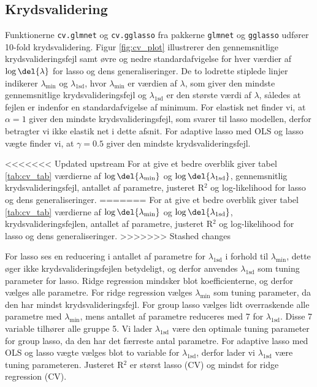 \subsection{Krydsvalidering}
Funktionerne \texttt{cv.glmnet} og \texttt{cv.gglasso} fra pakkerne \texttt{glmnet} og \texttt{gglasso} udfører 10-fold krydsvalidering.
Figur \ref{fig:cv_plot} illustrerer den gennemsnitlige krydsvalideringsfejl samt øvre og nedre standardafvigelse for hver værdier af $\log \del{\lambda}$ for lasso og dens generaliseringer. 
De to lodrette stiplede linjer indikerer \(\lambda_{\text{min}}\) og \(\lambda_\text{1sd}\), hvor \(\lambda_{\text{min}}\) er værdien af \(\lambda\), som giver den mindste gennemsnitlige krydsvalideringsfejl og \(\lambda_\text{1sd}\) er den største værdi af \(\lambda\), således at fejlen er indenfor en standardafvigelse af minimum. 
For elastisk net finder vi, at $\alpha =1$ giver den mindste krydsvalideringsfejl, som svarer til lasso modellen, derfor betragter vi ikke elastik net i dette afsnit. 
For adaptive lasso med OLS og lasso vægte finder vi, at $\gamma = 0.5$ giver den mindste krydsvalideringsfejl. 

%
<<<<<<< Updated upstream
For at give et bedre overblik giver tabel \ref{tab:cv_tab} værdierne af $\log \del{ \lambda_{\min}}$ og $\log \del{ \lambda_{1\text{sd}}}$, gennemsnitlig krydsvalideringsfejl, antallet af parametre, justeret R$^2$ og log-likelihood for lasso og dens generaliseringer.
=======
For at give et bedre overblik giver tabel \ref{tab:cv_tab} værdierne af $\log \del{ \lambda_{\min}}$ og $\log \del{ \lambda_{1\text{sd}}}$, krydsvalideringsfejlen, antallet af parametre, justeret R$^2$ og log-likelihood for lasso og dens generaliseringer.
>>>>>>> Stashed changes

 

For lasso ses en reducering i antallet af parametre for $\lambda_{1\text{sd}}$ i forhold til $\lambda_{\min}$, dette øger ikke krydsvalideringsfejlen betydeligt, og derfor anvendes $\lambda_{1\text{sd}}$ som tuning parameter for lasso. 
Ridge regression mindsker blot koefficienterne, og derfor vælges alle parametre. 
For ridge regression vælges \(\lambda_{\min}\) som tuning parameter, da den har mindst krydsvalideringsfejl.
For group lasso vælges lidt overraskende alle parametre med \(\lambda_\text{min}\), mens antallet af parametre reduceres med 7 for $\lambda_{1\text{sd}}$. 
Disse 7 variable tilhører alle gruppe 5.
Vi lader $\lambda_{1\text{sd}}$ være den optimale tuning parameter for group lasso, da den har det færreste antal parametre.
For adaptive lasso med OLS og lasso vægte vælges blot to variable for \(\lambda_{1\text{sd}}\), derfor lader vi $\lambda_{1\text{sd}}$ være tuning parameteren.  
Justeret R\(^2\) er størst lasso (CV) og mindst for ridge regression (CV).

